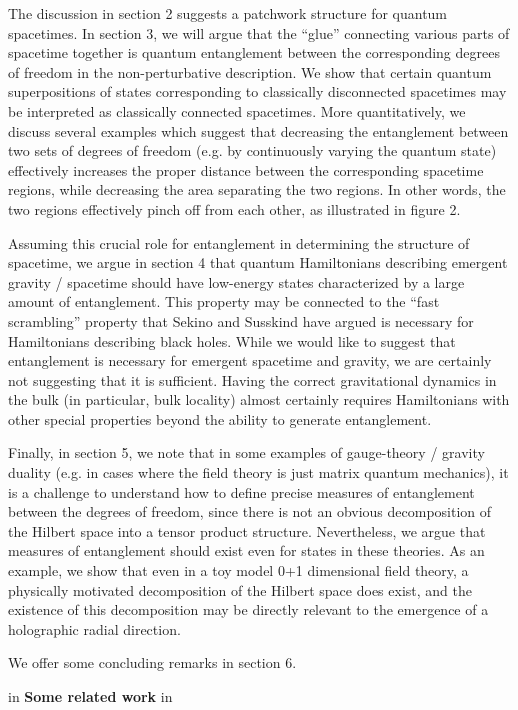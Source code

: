 \documentclass[12pt,epsf]{article}
\renewcommand{\(}{\left(}
\renewcommand{\)}{\right)}
\begin{document}
The discussion in section 2 suggests a patchwork structure for quantum spacetimes. In section 3, we will argue that the ``glue'' connecting various parts of spacetime together is quantum entanglement between the corresponding degrees of freedom in the non-perturbative description. We show that certain quantum superpositions of states corresponding to classically disconnected spacetimes may be interpreted as classically connected spacetimes. More quantitatively, we discuss several examples which suggest that decreasing the entanglement between two sets of degrees of freedom (e.g. by continuously varying the quantum state) effectively increases the proper distance between the corresponding spacetime regions, while decreasing the area separating the two regions. In other words, the two regions effectively pinch off from each other, as illustrated in figure 2.

Assuming this crucial role for entanglement in determining the structure of spacetime, we argue in section 4 that quantum Hamiltonians describing emergent gravity / spacetime should have low-energy states characterized by a large amount of entanglement. This property may be connected to the ``fast scrambling'' property that Sekino and Susskind \cite{ss} have argued is necessary for Hamiltonians describing black holes. While we would like to suggest that entanglement is necessary for emergent spacetime and gravity, we are certainly not suggesting that it is sufficient. Having the correct gravitational dynamics in the bulk (in particular, bulk locality) almost certainly requires Hamiltonians with other special properties beyond the ability to generate entanglement.

Finally, in section 5, we note that in some examples of gauge-theory / gravity duality (e.g. in cases where the field theory is just matrix quantum mechanics), it is a challenge to understand how to define precise measures of entanglement between the degrees of freedom, since there is not an obvious decomposition of the Hilbert space into a tensor product structure. Nevertheless, we argue that measures of entanglement should exist even for states in these theories. As an example, we show that even in a toy model 0+1 dimensional field theory, a physically motivated decomposition of the Hilbert space does exist, and the existence of this decomposition may be directly relevant to the emergence of a holographic radial direction.

We offer some concluding remarks in section 6.

 in
\noindent
{\bf Some related work}
 in
\end{document}
